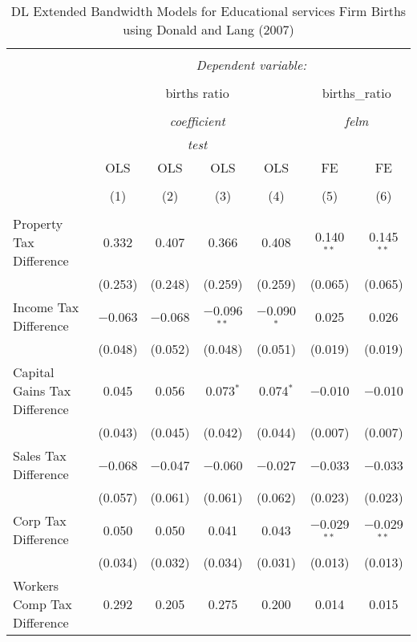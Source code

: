 
\begin{table}[!htbp] \centering 
  \caption{DL Extended Bandwidth Models for  Educational services Firm Births using Donald and Lang (2007)} 
  \label{} 
\begin{tabular}{@{\extracolsep{5pt}}lcccccc} 
\\[-1.8ex]\hline 
\hline \\[-1.8ex] 
 & \multicolumn{6}{c}{\textit{Dependent variable:}} \\ 
\cline{2-7} 
\\[-1.8ex] & \multicolumn{4}{c}{births ratio} & \multicolumn{2}{c}{births\_ratio} \\ 
\\[-1.8ex] & \multicolumn{4}{c}{\textit{coefficient}} & \multicolumn{2}{c}{\textit{felm}} \\ 
 & \multicolumn{4}{c}{\textit{test}} & \multicolumn{2}{c}{\textit{}} \\ 
 & OLS & OLS & OLS & OLS & FE & FE \\ 
\\[-1.8ex] & (1) & (2) & (3) & (4) & (5) & (6)\\ 
\hline \\[-1.8ex] 
 Property Tax Difference & 0.332 & 0.407 & 0.366 & 0.408 & 0.140$^{**}$ & 0.145$^{**}$ \\ 
  & (0.253) & (0.248) & (0.259) & (0.259) & (0.065) & (0.065) \\ 
  Income Tax Difference & $-$0.063 & $-$0.068 & $-$0.096$^{**}$ & $-$0.090$^{*}$ & 0.025 & 0.026 \\ 
  & (0.048) & (0.052) & (0.048) & (0.051) & (0.019) & (0.019) \\ 
  Capital Gains Tax Difference & 0.045 & 0.056 & 0.073$^{*}$ & 0.074$^{*}$ & $-$0.010 & $-$0.010 \\ 
  & (0.043) & (0.045) & (0.042) & (0.044) & (0.007) & (0.007) \\ 
  Sales Tax Difference & $-$0.068 & $-$0.047 & $-$0.060 & $-$0.027 & $-$0.033 & $-$0.033 \\ 
  & (0.057) & (0.061) & (0.061) & (0.062) & (0.023) & (0.023) \\ 
  Corp Tax Difference & 0.050 & 0.050 & 0.041 & 0.043 & $-$0.029$^{**}$ & $-$0.029$^{**}$ \\ 
  & (0.034) & (0.032) & (0.034) & (0.031) & (0.013) & (0.013) \\ 
  Workers Comp Tax Difference & 0.292 & 0.205 & 0.275 & 0.200 & 0.014 & 0.015 \\ 

\end{tabular}
\end{table}
